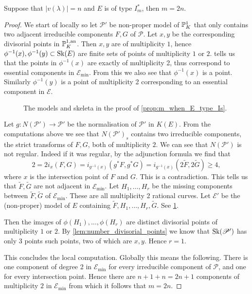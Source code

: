 \begin{proposition}\label{prop:m_when_E_type_Is}
	Suppose that $|v(\lambda)| = n$ and $E$ is of type $I_m^*$, then $m = 2n$. 
\end{proposition}
\begin{proof}
	We start of locally so let $\mathscr P'$ be non-proper model of $\mathbb{P}^{1}_K$ that only contains two adjacent irreducible components $F, G$ of  $\mathscr P$.
	Let $x, y $ be the corresponding divisorial points in $\mathbb{P}^{1, \text{an}}_K$. 
	Then $x, y$ are of multiplicity $1$, hence $\phi^{-1}(x), \phi^{-1}(y) \subset  \sk(E)$ are finite sets of points of multiplicity $1$ or $2$. 
	 tells us that the points in $\phi^{-1}(x)$ are exactly of multiplicity 2, thus correspond to essential components in $\mathscr E_\text{min} $.
	From this we also see that $\phi^{-1}(x)$ is a point. 
	Similarly $\phi^{-1}(y)$ is a point of multiplicity 2 corresponding to an essential component in $\mathscr E$. 

\begin{figure}[ht]
    \centering
    \caption{The models and skeleta in the proof of \cref{prop:m_when_E_type_Is}.}
    \label{fig:models_proof_is}
\end{figure}

	Let $g: N(\mathscr P') \to \mathscr P'$ be the normalisation of $\mathscr P'$ in $K(E)$.
	From the computations above we see that $N(\mathscr P')_s$ contains two irreducible components, the strict transforms of $F, G$, both of multiplicity $2$. 
	We can see that $N(\mathscr P')$ is not regular. 
	Indeed if it was regular, by the adjunction formula we find that \[
		2 = 2i_x(F, G) =  i_{g^{-1}(x)}(g^* F, g^* G) =  i_{g^{-1}(x)}(2 \tilde F,   2 \tilde G)  \ge 4
	,\] 
	where $x$ is the intersection point of $F$ and $G$. 
	This is a contradiction. 
	This tells us that $\tilde F, \tilde G$ are not adjacent in $\mathscr E_\text{min} $. 
	Let $H_1, \ldots, H_r$ be the missing components between $\tilde F, \tilde G$ of $\mathscr E_\text{min} $. 
	These are all multiplicity 2 rational curves. 
	Let $\mathscr E'$ be the (non-proper) model of $E$ containing $\tilde F, H_1, \ldots, H_r, \tilde G$. See \cref{fig:models_proof_is}.
	
Then the images of $\phi(H_1), \ldots, \phi(H_r)$ are distinct divisorial points of multiplicity $1$ or $2$.
By \cref{lem:number_divisorial_points} we know that $\operatorname{Sk}(\mathscr P')$ has only 3 points such points, two of which are $x, y$. 
Hence $r = 1$. 

This concludes the local computation. Globally this means the following. 
There is one component of degree 2 in $\mathscr E_\text{min} $ for every irreducible component of $\mathscr P$, and one for every intersection point. 
Hence there are $n + 1 + n = 2n + 1$ components of multiplicity $2$ in $\mathscr E_\text{min} $ from which it follows that $m = 2n$.  
\end{proof}


